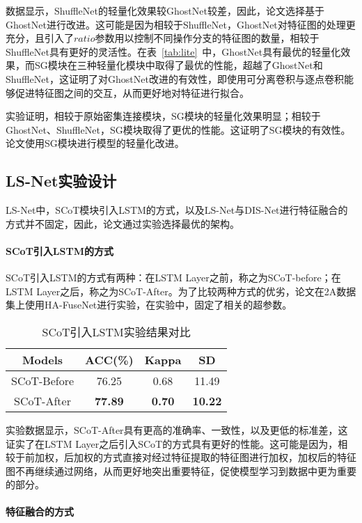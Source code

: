 数据显示，ShuffleNet的轻量化效果较GhostNet较差，因此，论文选择基于GhostNet进行改进。这可能是因为相较于ShuffleNet，GhostNet对特征图的处理更充分，且引入了\(ratio\)参数用以控制不同操作分支的特征图的数量，相较于ShuffleNet具有更好的灵活性。在表~\ref{tab:lite}~中，GhostNet具有最优的轻量化效果，而SG模块在三种轻量化模块中取得了最优的性能，超越了GhostNet和ShuffleNet，这证明了对GhostNet改进的有效性，即使用可分离卷积与逐点卷积能够促进特征图之间的交互，从而更好地对特征进行拟合。

实验证明，相较于原始密集连接模块，SG模块的轻量化效果明显；相较于GhostNet、ShuffleNet，SG模块取得了更优的性能。这证明了SG模块的有效性。论文使用SG模块进行模型的轻量化改进。

\subsection{LS-Net实验设计}

LS-Net中，SCoT模块引入LSTM的方式，以及LS-Net与DIS-Net进行特征融合的方式并不固定，因此，论文通过实验选择最优的架构。

\paragraph{SCoT引入LSTM的方式}

SCoT引入LSTM的方式有两种：在LSTM Layer之前，称之为SCoT-before；在LSTM Layer之后，称之为SCoT-After。为了比较两种方式的优劣，论文在2A数据集上使用HA-FuseNet进行实验，在实验中，固定了相关的超参数。
\begin{table}[ht]
    \centering
    \caption{SCoT引入LSTM实验结果对比}
    \label{tab:ls}
    \begin{tabularx}{\textwidth}{CCCC}
      \toprule
      Models & ACC(\%) & Kappa & SD \\
      \midrule
      SCoT-Before & 76.25 & 0.68 & 11.49 \\
      SCoT-After & \textbf{77.89} & \textbf{0.70} & \textbf{10.22} \\
      \bottomrule
    \end{tabularx}
\end{table}

实验数据显示，SCoT-After具有更高的准确率、一致性，以及更低的标准差，这证实了在LSTM Layer之后引入SCoT的方式具有更好的性能。这可能是因为，相较于前加权，后加权的方式直接对经过特征提取的特征图进行加权，加权后的特征图不再继续通过网络，从而更好地突出重要特征，促使模型学习到数据中更为重要的部分。

\paragraph{特征融合的方式}

